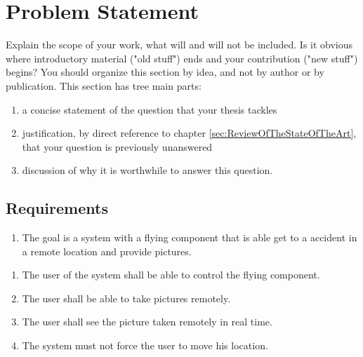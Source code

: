 \renewcommand{\theenumi}{\Alph{enumi}}

\chapter{Problem Statement}
\label{sec:ProblemStatement}

Explain the scope of your work, what will and will not be included. Is it
obvious where introductory material ("old stuff") ends and your contribution
("new stuff") begins? You should organize this section by idea, and not by
author or by publication. This section has tree main parts:

\begin{enumerate}
  \item a concise statement of the question that your thesis tackles
  \item justification, by direct reference to chapter
  \ref{sec:ReviewOfTheStateOfTheArt}, that your question is previously
  unanswered
  \item discussion of why it is worthwhile to answer this question.
\end{enumerate}

\section{Requirements}

\label{sec:Requirements}

\begin{enumerate}[label=\bfseries Goal:]%
  \item The goal is a system with a flying component that is able get to a accident in a remote location and provide pictures.
\end{enumerate}

\begin{enumerate}[label=\bfseries D \arabic*:]
  \item The user of the system shall be able to control the flying component.
  \item The user shall be able to take pictures remotely.
  \item The user shall see the picture taken remotely in real time.
  \item The system must not force the user to move his location.
\end{enumerate}

